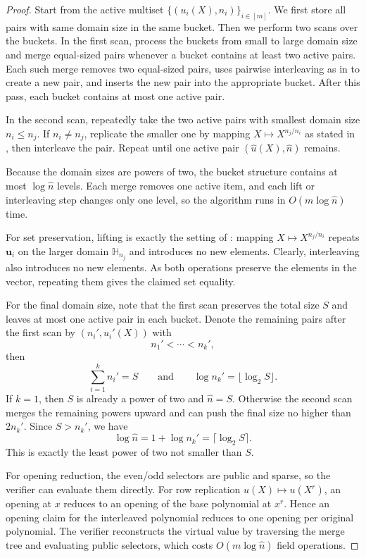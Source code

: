 \begin{proof}
Start from the active multiset $\{(u_i(X),n_i)\}_{i\in[m]}$.
We first store all pairs with same domain size in the same bucket.
Then we perform two scans over the buckets.
In the first scan, process the buckets from small to large domain size and
merge equal-sized pairs whenever a bucket contains at least two active pairs.
Each such merge removes two equal-sized pairs,
uses pairwise interleaving as in
 to create a new pair,
and inserts the new pair into the appropriate bucket. After this
pass, each bucket contains at most one active pair.

In the second scan, repeatedly take the two active pairs with smallest domain size $n_i \leq n_j$.
If $n_i\neq n_j$, replicate the smaller one by mapping $X\mapsto X^{n_j/n_i}$
as stated in ,
then interleave the pair.
Repeat until one active pair $(\widehat{u}(X),\widehat{n})$ remains.

Because the domain sizes are powers of two, the bucket structure contains at most
$\log \widehat{n}$ levels. Each merge removes one active item, and each lift
or interleaving step changes only one level, so the algorithm runs
in $O(m\log \widehat{n})$ time.

For set preservation, lifting is exactly the setting of
:
mapping $X\mapsto X^{n_j/n_i}$ repeats
$\mathbf{u}_i$ on the larger domain $\mathbb{H}_{n_j}$ and introduces no new
elements. Clearly, interleaving also introduces no new elements.
As both operations preserve the elements in the vector, repeating them
gives the claimed set equality.

For the final domain size, note that the first scan preserves the total size $S$ and
leaves at most one active pair in each bucket. 
Denote the remaining pairs after the first scan by $(n_i', u_i'(X))$ with
\[
n_1'<\cdots<n_k',
\]
then
\[
\sum_{i=1}^k n_i' = S
\qquad\text{and}\qquad
\log n_k' = \lfloor \log_2 S\rfloor.
\]
If $k=1$, then $S$ is already a power of two and $\widehat{n}=S$. Otherwise
the second scan merges the remaining powers upward and can push the final size
no higher than $2n_k'$. Since $S>n_k'$, we have
\[
\log \widehat{n}= 1 + \log n_k' = \lceil \log_2 S\rceil.
\]
This is exactly the least power of two not smaller than $S$.

For opening reduction, the even/odd selectors are public and sparse, so the verifier can
evaluate them directly. For row replication $u(X)\mapsto u(X^r)$, an opening at
$x$ reduces to an opening of the base polynomial at $x^r$. Hence an opening
claim for the interleaved polynomial reduces to one opening per original
polynomial. The verifier reconstructs the virtual value by traversing the merge
tree and evaluating public selectors, which costs $O(m\log \widehat{n})$ field
operations.
\end{proof}

